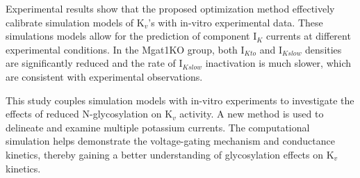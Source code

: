 \documentclass[10pt,letterpaper]{article}
\begin{document}
Experimental results show that the proposed optimization method effectively calibrate simulation models of $\text{K}_{v}$'s with in-vitro experimental data. These simulations models allow for the prediction of component $\text{I}_{K}$ currents at different experimental conditions. In the Mgat1KO group, both $\text{I}_{Kto}$ and $\text{I}_{Kslow}$ densities are significantly reduced and the rate of $\text{I}_{Kslow}$ inactivation is much slower, which are consistent with experimental observations.

This study couples simulation models with in-vitro experiments to investigate the effects of reduced N-glycosylation on $\text{K}_{v}$ activity. A new method is used to delineate and examine multiple potassium currents. The computational simulation helps demonstrate the voltage-gating mechanism and conductance kinetics, thereby gaining a better understanding of glycosylation effects on $\text{K}_{v}$ kinetics.
\end{document}
